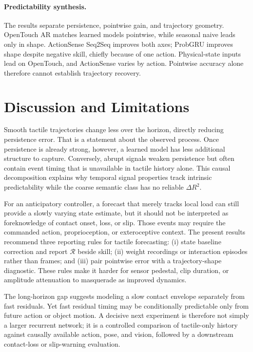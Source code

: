 \documentclass[letterpaper, 10 pt, conference]{ieeeconf}
\newcommand{\Rdiff}{\mathcal{R}}
\newcommand{\dRtwo}{\Delta R^{2}}
\begin{document}
\paragraph{Predictability synthesis.}
The results separate persistence, pointwise gain, and trajectory geometry. OpenTouch AR matches learned models pointwise, while seasonal naive leads only in shape. ActionSense Seq2Seq improves both axes; ProbGRU improves shape despite negative skill, chiefly because of one action. Physical-state inputs lead on OpenTouch, and ActionSense varies by action. Pointwise accuracy alone therefore cannot establish trajectory recovery.

\section{Discussion and Limitations}
\label{sec:discussion}
\label{sec:limitations}

Smooth tactile trajectories change less over the horizon, directly reducing persistence error. That is a statement about the observed process. Once persistence is already strong, however, a learned model has less additional structure to capture. Conversely, abrupt signals weaken persistence but often contain event timing that is unavailable in tactile history alone. This causal decomposition explains why temporal signal properties track intrinsic predictability while the coarse semantic class has no reliable $\dRtwo$.

For an anticipatory controller, a forecast that merely tracks local load can still provide a slowly varying state estimate, but it should not be interpreted as foreknowledge of contact onset, loss, or slip. Those events may require the commanded action, proprioception, or exteroceptive context. The present results recommend three reporting rules for tactile forecasting: (i) state baseline correction and report $\Rdiff$ beside skill; (ii) weight recordings or interaction episodes rather than frames; and (iii) pair pointwise error with a trajectory-shape diagnostic. These rules make it harder for sensor pedestal, clip duration, or amplitude attenuation to masquerade as improved dynamics.

The long-horizon gap suggests modeling a slow contact envelope separately from fast residuals. Yet fast residual timing may be conditionally predictable only from future action or object motion. A decisive next experiment is therefore not simply a larger recurrent network; it is a controlled comparison of tactile-only history against causally available action, pose, and vision, followed by a downstream contact-loss or slip-warning evaluation.
\end{document}
